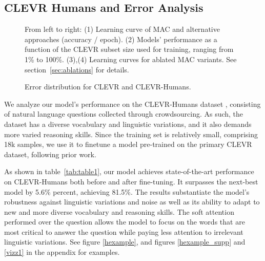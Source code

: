 \documentclass[fleqn]{article}
\newcommand{\tabref}[1]{table~\ref{tab:#1}}
\newcommand{\secref}[1]{section~\ref{sec:#1}}
\begin{document}
\subsection{CLEVR Humans and Error Analysis}

\begin{figure}
\centering
{}
\hfill
{}
\hfill
{}
\hfill
{}
\caption{From left to right: (1) Learning curve of MAC and alternative approaches (accuracy / epoch). (2) Models' performance as a function of the CLEVR subset size used for training, ranging from 1\% to 100\%. (3),(4) Learning curves for ablated MAC variants. See \secref{ablations} for details. }
\label{fig:plots}
\end{figure}

\begin{wrapfigure}[19]{r}{0.245\textwidth}
\centering
\vspace{-8mm}
\centering
{}
\vspace*{-3mm}

\caption{Error distribution for CLEVR and CLEVR-Humans.}
\label{fig:error_dist}

\end{wrapfigure}
We analyze our model's performance on the CLEVR-Humans dataset \citep{pgee}, consisting of natural language questions collected through crowdsourcing. As such, the dataset has a diverse vocabulary and linguistic variations, and it also demands more varied reasoning skills. Since the training set is relatively small, comprising 18k samples, we use it to finetune a model pre-trained on the primary CLEVR dataset, following prior work. 

As shown in \tabref{table1}, our model achieves state-of-the-art performance on CLEVR-Humans both before and after fine-tuning. It surpasses the next-best model by 5.6\% percent, achieving 81.5\%. The results substantiate the model's robustness against linguistic variations and noise as well as its ability to adapt to new and more diverse vocabulary and reasoning skills. The soft attention performed over the question allows the model to focus on the words that are most critical to answer the question while paying less attention to irrelevant linguistic variations. See figure \ref{hexample}, and figures \ref{hexample_supp} and \ref{vizz1} in the appendix for examples. 
\end{document}
